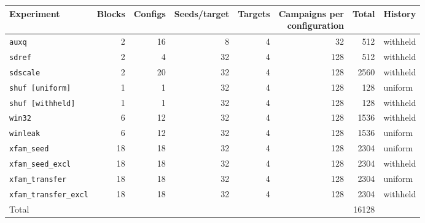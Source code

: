 \begin{tabular}{lrrrrrrl}
\toprule
Experiment & Blocks & Configs & Seeds/target & Targets & \shortstack{Campaigns per\\configuration} & Total & History \\
\midrule
\texttt{auxq} & 2 & 16 & 8 & 4 & 32 & 512 & withheld \\
\texttt{sdref} & 2 & 4 & 32 & 4 & 128 & 512 & withheld \\
\texttt{sdscale} & 2 & 20 & 32 & 4 & 128 & 2560 & withheld \\
\texttt{shuf [uniform]} & 1 & 1 & 32 & 4 & 128 & 128 & uniform \\
\texttt{shuf [withheld]} & 1 & 1 & 32 & 4 & 128 & 128 & withheld \\
\texttt{win32} & 6 & 12 & 32 & 4 & 128 & 1536 & withheld \\
\texttt{winleak} & 6 & 12 & 32 & 4 & 128 & 1536 & uniform \\
\texttt{xfam\_seed} & 18 & 18 & 32 & 4 & 128 & 2304 & uniform \\
\texttt{xfam\_seed\_excl} & 18 & 18 & 32 & 4 & 128 & 2304 & withheld \\
\texttt{xfam\_transfer} & 18 & 18 & 32 & 4 & 128 & 2304 & uniform \\
\texttt{xfam\_transfer\_excl} & 18 & 18 & 32 & 4 & 128 & 2304 & withheld \\
\midrule
Total & & & & & & 16128 & \\
\bottomrule
\end{tabular}
